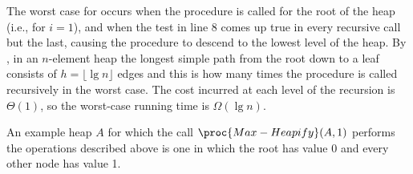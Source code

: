 The worst case for  occurs when the procedure is called for the root of the heap (i.e., for $i=1$), and when the test in line 8 comes up true in every recursive call but the last, causing the procedure to descend to the lowest level of the heap.
By , in an $n$-element heap the longest simple path from the root down to a leaf consists of $h=\lfloor\lg n\rfloor$ edges and this is how many times the procedure is called recursively in the worst case.
The cost incurred at each level of the recursion is $\Theta(1)$, so the worst-case running time is $\Omega(\lg n)$.

An example heap $A$ for which the call $\proc{Max-Heapify}(A,1)$ performs the operations described above is one in which the root has value 0 and every other node has value 1.
